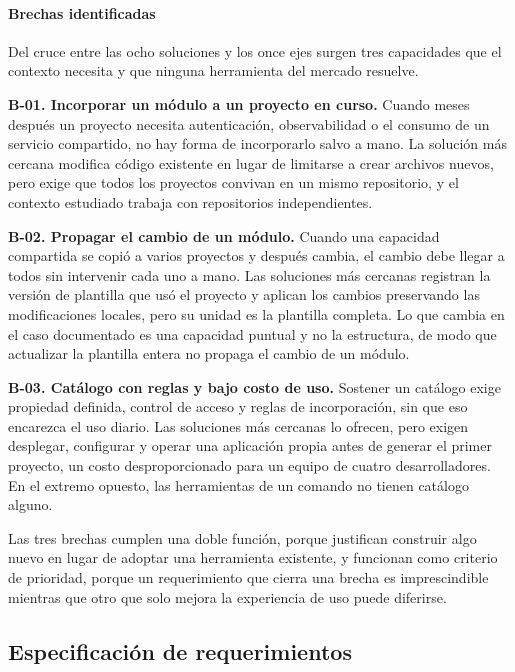 \paragraph*{Brechas identificadas}
\label{sec:brechas}

Del cruce entre las ocho soluciones y los once ejes surgen tres capacidades
que el contexto necesita y que ninguna herramienta del mercado resuelve.

\textbf{B-01. Incorporar un módulo a un proyecto en curso.} Cuando meses
después un proyecto necesita autenticación, observabilidad o el consumo de un
servicio compartido, no hay forma de incorporarlo salvo a mano. La solución
más cercana modifica código existente en lugar de limitarse a crear archivos
nuevos, pero exige que todos los proyectos convivan en un mismo repositorio,
y el contexto estudiado trabaja con repositorios independientes.

\textbf{B-02. Propagar el cambio de un módulo.} Cuando una capacidad
compartida se copió a varios proyectos y después cambia, el cambio debe
llegar a todos sin intervenir cada uno a mano. Las soluciones más cercanas
registran la versión de plantilla que usó el proyecto y aplican los cambios
preservando las modificaciones locales, pero su unidad es la plantilla
completa. Lo que cambia en el caso documentado es una capacidad puntual y no
la estructura, de modo que actualizar la plantilla entera no propaga el
cambio de un módulo.

\textbf{B-03. Catálogo con reglas y bajo costo de uso.} Sostener un catálogo
exige propiedad definida, control de acceso y reglas de incorporación, sin
que eso encarezca el uso diario. Las soluciones más cercanas lo ofrecen, pero
exigen desplegar, configurar y operar una aplicación propia antes de generar
el primer proyecto, un costo desproporcionado para un equipo de cuatro
desarrolladores. En el extremo opuesto, las herramientas de un comando no
tienen catálogo alguno.

Las tres brechas cumplen una doble función, porque justifican construir algo
nuevo en lugar de adoptar una herramienta existente, y funcionan como criterio
de prioridad, porque un requerimiento que cierra una brecha es imprescindible
mientras que otro que solo mejora la experiencia de uso puede diferirse.

\subsection{Especificación de requerimientos}
\label{sec:especificacion-requerimientos}

